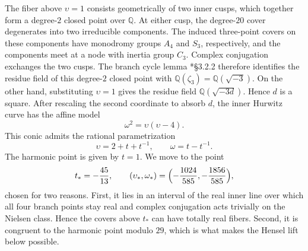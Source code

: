 \documentclass[10pt]{amsart}
\numberwithin{equation}{section}
\theoremstyle{definition}
\theoremstyle{remark}
\newcommand{\Q}{\mathbb{Q}}
\begin{document}
  The fiber above $\upsilon=1$ consists geometrically of two inner cusps, which together form a degree-$2$ closed point over $\Q$. At either cusp, the
  degree-$20$ cover degenerates into two irreducible components. The induced three-point covers on these components have monodromy groups $A_4$ and $S_3$, respectively, and the components meet at a node with inertia group $C_3$.
  Complex conjugation exchanges the two cusps. The branch cycle lemma
  \cite{BaileyFried2002}*{\S3.2.2} therefore identifies the residue field of this degree-$2$ closed point with $\Q(\zeta_3)=\Q(\sqrt{-3})$.
  On the other hand, substituting $\upsilon=1$ gives the residue field $\Q(\sqrt{-3d})$. Hence $d$ is a square. After rescaling the second coordinate to absorb $d$, the inner Hurwitz curve has the affine model
  \[
   \omega^2=\upsilon(\upsilon-4).
  \]
  This conic admits the rational parametrization
\begin{equation}\label{eq:l19-inner-line}
 \upsilon=2+t+t^{-1},\qquad \omega=t-t^{-1} .
\end{equation}
The harmonic point is given by $t=1$.  We move to the point
\begin{equation}\label{eq:l19-inner-target}
 t_*=-\frac{45}{13},
 \qquad
 (\upsilon_*,\omega_*)=
 \Bigl(-\frac{1024}{585},-\frac{1856}{585}\Bigr),
\end{equation}
chosen for two reasons.  First, it lies in an interval of the real inner
line over which all four branch points stay real and complex conjugation acts
trivially on the Nielsen class. Hence the covers above $t_*$ can have totally
real fibers.  Second, it is congruent to the harmonic point modulo $29$,
which is what makes the Hensel lift below possible. 
\end{document}

